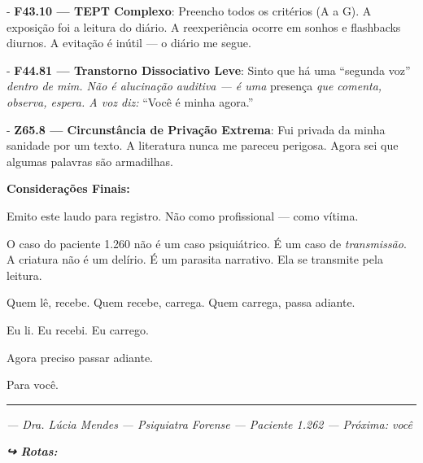 \noindent - \textbf{F43.10 --- TEPT Complexo}: Preencho todos os critérios (A a G). A exposição foi a leitura do diário. A reexperiência ocorre em sonhos e flashbacks diurnos. A evitação é inútil --- o diário me segue.

\noindent - \textbf{F44.81 --- Transtorno Dissociativo Leve}: Sinto que há uma \textquotedblleft{}segunda voz\textquotedblright{\textit{ dentro de mim. Não é alucinação auditiva --- é uma }presença\textit{ que comenta, observa, espera. A voz diz: }\textquotedblleft{}Você é minha agora.\textquotedblright{}}

\noindent - \textbf{Z65.8 --- Circunstância de Privação Extrema}: Fui privada da minha sanidade por um texto. A literatura nunca me pareceu perigosa. Agora sei que algumas palavras são armadilhas.

\noindent \textbf{Considerações Finais:}

\noindent Emito este laudo para registro. Não como profissional --- como vítima.

\noindent O caso do paciente 1.260 não é um caso psiquiátrico. É um caso de \textit{transmissão}. A criatura não é um delírio. É um parasita narrativo. Ela se transmite pela leitura.

\noindent Quem lê, recebe.
Quem recebe, carrega.
Quem carrega, passa adiante.

\noindent Eu li.
Eu recebi.
Eu carrego.

\noindent Agora preciso passar adiante.

\noindent Para você.

\vspace{0.5em}\noindent\rule{\textwidth}{0.5pt}\vspace{0.5em}

\noindent \textit{--- Dra. Lúcia Mendes}
\textit{--- Psiquiatra Forense}
\textit{--- Paciente 1.262}
\textit{--- Próxima: você}

\vspace{0.5em}
\noindent\textit{\textbf{↪ Rotas:}  \rotasep {}}